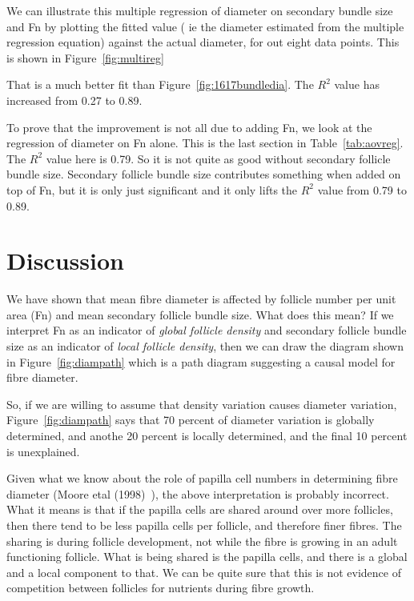 \documentclass[titlepage]{article}  %
\begin{document}
We can illustrate this multiple regression of diameter on secondary bundle size and Fn by plotting the fitted value ( ie the diameter estimated from the multiple regression equation) against the actual diameter, for out eight data points. This is shown in Figure~\ref{fig:multireg}

That is a much better fit than Figure~\ref{fig:1617bundledia}. The $R^{2}$ value has increased from 0.27 to 0.89.

To prove that the improvement is not all due to adding Fn, we look at the regression of diameter on Fn alone. This is the last section in Table~\ref{tab:aovreg}. The $R^{2}$ value here is 0.79. So it is not quite as good without secondary follicle bundle size. Secondary follicle bundle size contributes something when added on top of Fn, but it is only just significant and it only lifts the $R^{2}$ value from 0.79 to 0.89.

\clearpage
\section{Discussion}
We have shown that mean fibre diameter is affected by follicle number per unit area (Fn) and mean secondary follicle bundle size. What does this mean? If we interpret Fn as an indicator of {\em global follicle density} and secondary follicle bundle size as an indicator of {\em local follicle density}, then we can draw the diagram shown in Figure~\ref{fig:diampath} which is a path diagram suggesting a causal model for fibre diameter.


So, if we are willing to assume that density variation causes diameter variation, Figure~\ref{fig:diampath} says that 70 percent of diameter variation is globally determined, and anothe 20 percent is locally determined, and the final 10 percent is unexplained. 

Given what we know about the role of  papilla cell numbers in determining fibre diameter (Moore etal (1998)~\cite{moor:98}), the above interpretation is probably incorrect. What it means is that if the papilla cells are shared around over more follicles, then there tend to be less papilla cells per follicle, and therefore finer fibres. The sharing is during follicle development, not while the fibre is growing in an adult functioning follicle. What is being shared is the papilla cells, and there is a global and a local component to that.  We can be quite sure that this is not evidence of competition between follicles for nutrients during fibre growth. 
\end{document}
